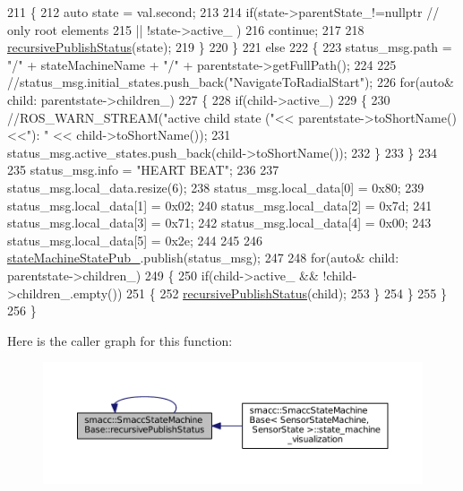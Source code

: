 \begin{DoxyCode}
211             \{
212                 \textcolor{keyword}{auto} state = val.second;
213 
214                 \textcolor{keywordflow}{if}(state->parentState\_!=\textcolor{keyword}{nullptr} \textcolor{comment}{// only root elements}
215                     || !state->active\_ )
216                         \textcolor{keywordflow}{continue};     
217 
218                 \hyperlink{structsmacc_1_1SmaccStateMachineBase_a5c078ef0eec2c64ecd9a31b46341b13c}{recursivePublishStatus}(state);
219             \}
220         \}
221         \textcolor{keywordflow}{else}
222         \{
223             status\_msg.path = \textcolor{stringliteral}{"/"} + stateMachineName + \textcolor{stringliteral}{"/"} + parentstate->getFullPath();
224 
225             \textcolor{comment}{//status\_msg.initial\_states.push\_back("NavigateToRadialStart");}
226             \textcolor{keywordflow}{for}(\textcolor{keyword}{auto}& child: parentstate->children\_)
227             \{
228                 \textcolor{keywordflow}{if}(child->active\_)
229                 \{
230                     \textcolor{comment}{//ROS\_WARN\_STREAM("active child state ("<< parentstate->toShortName()<<"): " <<
       child->toShortName());}
231                     status\_msg.active\_states.push\_back(child->toShortName());
232                 \}
233             \}
234 
235              status\_msg.info = \textcolor{stringliteral}{"HEART BEAT"};
236         
237             status\_msg.local\_data.resize(6);
238             status\_msg.local\_data[0] = 0x80;
239             status\_msg.local\_data[1] = 0x02;
240             status\_msg.local\_data[2] = 0x7d;
241             status\_msg.local\_data[3] = 0x71;
242             status\_msg.local\_data[4] = 0x00;
243             status\_msg.local\_data[5] = 0x2e;
244 
245 
246             \hyperlink{structsmacc_1_1SmaccStateMachineBase_a7c76e7a7d6c00d9831472297ff51e38c}{stateMachineStatePub\_}.publish(status\_msg);
247 
248             \textcolor{keywordflow}{for}(\textcolor{keyword}{auto}& child: parentstate->children\_)
249             \{
250                 \textcolor{keywordflow}{if}(child->active\_ && !child->children\_.empty())
251                 \{
252                     \hyperlink{structsmacc_1_1SmaccStateMachineBase_a5c078ef0eec2c64ecd9a31b46341b13c}{recursivePublishStatus}(child);
253                 \}
254             \}
255         \}
256     \}
\end{DoxyCode}


Here is the caller graph for this function\+:
\nopagebreak
\begin{figure}[H]
\begin{center}
\leavevmode
\includegraphics[width=350pt]{structsmacc_1_1SmaccStateMachineBase_a5c078ef0eec2c64ecd9a31b46341b13c_icgraph}
\end{center}
\end{figure}


